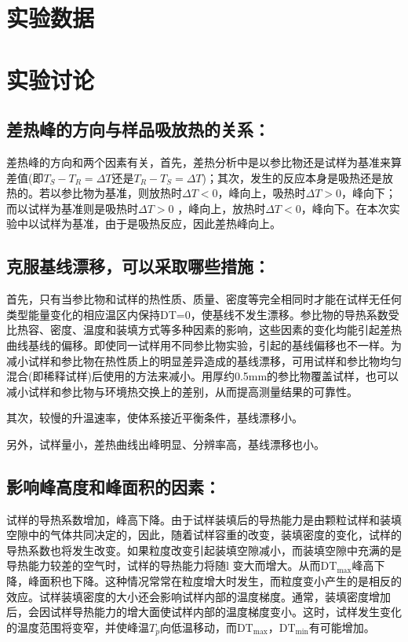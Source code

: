 \documentclass[a4paper]{article}
\begin{document}
\section{实验数据}

\section{实验讨论}
\iffalse
\subsection{差热峰的方向与样品吸放热的关系：}
差热峰的方向和两个因素有关，首先，差热分析中是以参比物还是试样为基准来算差值(即$T_S-T_R=\Delta T$还是$T_R-T_S=\Delta T$)；其次，发生的反应本身是吸热还是放热的。若以参比物为基准，则放热时$\Delta T<$0，峰向上，吸热时$\Delta T>$0，峰向下；而以试样为基准则是吸热时$\Delta T>$0 ，峰向上，放热时$\Delta T<$0，峰向下。在本次实验中以试样为基准，由于是吸热反应，因此差热峰向上。
\subsection{克服基线漂移，可以采取哪些措施：}
首先，只有当参比物和试样的热性质、质量、密度等完全相同时才能在试样无任何类型能量变化的相应温区内保持DT=0，使基线不发生漂移。参比物的导热系数受比热容、密度、温度和装填方式等多种因素的影响，这些因素的变化均能引起差热曲线基线的偏移。即使同一试样用不同参比物实验，引起的基线偏移也不一样。为减小试样和参比物在热性质上的明显差异造成的基线漂移，可用试样和参比物均匀混合(即稀释试样)后使用的方法来减小。用厚约0.5mm的参比物覆盖试样，也可以减小试样和参比物与环境热交换上的差别，从而提高测量结果的可靠性。

其次，较慢的升温速率，使体系接近平衡条件，基线漂移小。

另外，试样量小，差热曲线出峰明显、分辨率高，基线漂移也小。
\subsection{影响峰高度和峰面积的因素：}
试样的导热系数增加，峰高下降。由于试样装填后的导热能力是由颗粒试样和装填空隙中的气体共同决定的，因此，随着试样容重的改变，装填密度的变化，试样的导热系数也将发生改变。如果粒度改变引起装填空隙减小，而装填空隙中充满的是导热能力较差的空气时，试样的导热能力将随l 变大而增大。从而$\text{DT}_{\text{max}}$峰高下降，峰面积也下降。这种情况常常在粒度增大时发生，而粒度变小产生的是相反的效应。试样装填密度的大小还会影响试样内部的温度梯度。通常，装填密度增加后，会因试样导热能力的增大面使试样内部的温度梯度变小。这时，试样发生变化的温度范围将变窄，并使峰温$T_p$向低温移动，而$\text{DT}_{\text{max}}$，$\text{DT}_{\text{min}}$有可能增加。
\end{document}
